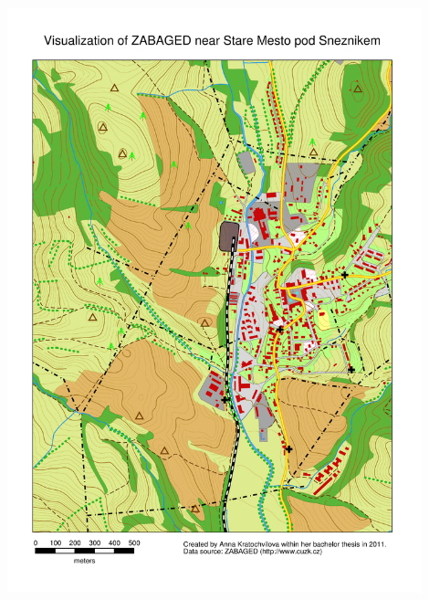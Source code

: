 \documentclass[a4paper,12pt,draft]{article}
\begin{document}
\begin{center}
\includegraphics[width=0.9\textwidth]
{./map_vystupy/psmap/zabaged.pdf}
\end{center}
\end{document}
